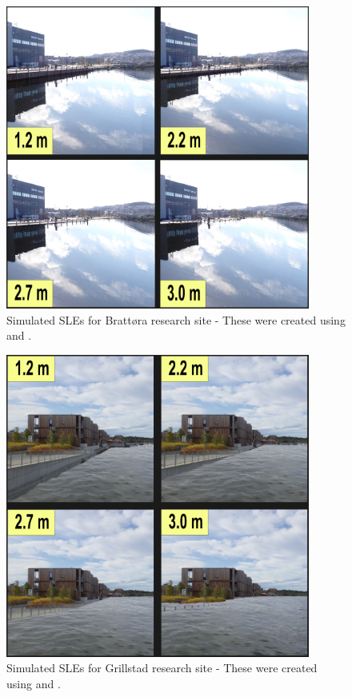 \begin{figure}[H]
    \centering
    \includegraphics[width=10cm]{fig_sle/brattora 2090 q.png}
    \caption{Simulated SLEs for Brattøra research site - These were created using \cite{kartverket_se_2021} and \cite{stormflo_database_stormflo_2021}. }
    \label{fig:SLE-brattora}
\end{figure}

\begin{figure}[H]
    \centering
    \includegraphics[width=10cm]{fig_sle/grillstad 2090 q.png}
    \caption{Simulated SLEs for Grillstad research site - These were created using \cite{kartverket_se_2021} and \cite{stormflo_database_stormflo_2021}. }
    \label{fig:SLE-grillstad}
\end{figure}


